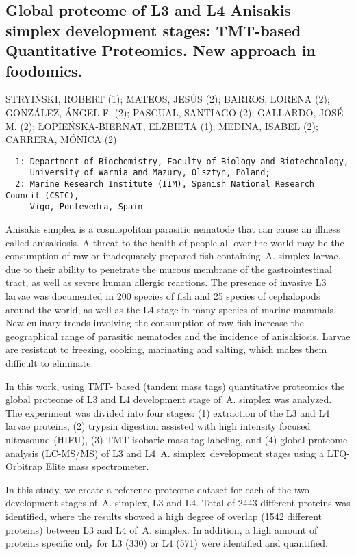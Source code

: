 {\subsection*{\color{eubicRed} Global proteome of L3 and L4 Anisakis simplex development stages: TMT-based Quantitative Proteomics. New approach in foodomics.}
{\color{eubicGray}STRYIŃSKI, ROBERT (1);
MATEOS, JESÚS (2);
BARROS, LORENA (2);
GONZÁLEZ, ÁNGEL F. (2);
PASCUAL, SANTIAGO (2);
GALLARDO, JOSÉ M. (2);
ŁOPIEŃSKA-BIERNAT, ELŻBIETA (1);
MEDINA, ISABEL (2);
CARRERA, MÓNICA (2)}
{\color{eubicGray}\begin{verbatim}
  1: Department of Biochemistry, Faculty of Biology and Biotechnology,
     University of Warmia and Mazury, Olsztyn, Poland;
  2: Marine Research Institute (IIM), Spanish National Research Council (CSIC),
     Vigo, Pontevedra, Spain
\end{verbatim}}

Anisakis simplex is a cosmopolitan parasitic nematode that can cause an illness called anisakiosis. A threat to the health of people all over the world may be the consumption of raw or inadequately prepared fish containing A. simplex larvae, due to their ability to penetrate the mucous membrane of the gastrointestinal tract, as well as severe human allergic reactions. The presence of invasive L3 larvae was documented in 200 species of fish and 25 species of cephalopods around the world, as well as the L4 stage in many species of marine mammals. New culinary trends involving the consumption of raw fish increase the geographical range of parasitic nematodes and the incidence of anisakiosis. Larvae are resistant to freezing, cooking, marinating and salting, which makes them difficult to eliminate.

In this work, using TMT- based (tandem mass tags) quantitative proteomics the global proteome of L3 and L4 development stage of A. simplex was analyzed. The experiment was divided into four stages: (1) extraction of the L3 and L4 larvae proteins, (2) trypsin digestion assisted with high intensity focused ultrasound (HIFU), (3) TMT-isobaric mass tag labeling, and (4) global proteome analysis (LC-MS/MS) of L3 and L4 A. simplex development stages using a LTQ-Orbitrap Elite mass spectrometer.

In this study, we create a reference proteome dataset for each of the two development stages of A. simplex, L3 and L4. Total of 2443 different proteins was identified, where the results showed a high degree of overlap (1542 different proteins) between L3 and L4 of A. simplex. In addition, a high amount of proteins specific only for L3 (330) or L4 (571) were identified and quantified.

}
